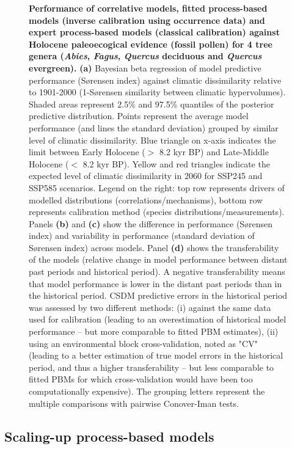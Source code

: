 \documentclass[pdflatex, sn-nature]{sn-jnl}%
\begin{document}
\begin{figure}[ht]
\begin{adjustwidth}{-0.5cm}{-0.5cm}
\caption{\textbf{Performance of correlative models, fitted process-based models (inverse calibration using occurrence data) and expert process-based models (classical calibration) against Holocene paleoecogical evidence (fossil pollen) for 4 tree genera (\emph{Abies}, \emph{Fagus}, \emph{Quercus} deciduous and \emph{Quercus} evergreen).} \textbf{(a)} Bayesian beta regression of model predictive performance (Sørensen index) against climatic dissimilarity relative to 1901-2000 (1-Sørensen similarity between climatic hypervolumes). Shaded areas represent 2.5\% and 97.5\% quantiles of the posterior predictive distribution. Points represent the average model performance (and lines the standard deviation) grouped by similar level of climatic dissimilarity. Blue triangle on x-axis indicates the limit between Early Holocene ($>$ 8.2 kyr BP) and Late-Middle Holocene ($<$ 8.2 kyr BP). Yellow and red triangles indicate the expected level of climatic dissimilarity in 2060 for SSP245 and SSP585 scenarios. Legend on the right: top row represents drivers of modelled distributions (correlations/mechanisms), bottom row represents calibration method (species distributions/measurements). Panels \textbf{(b)} and \textbf{(c)} show the difference in performance (Sørensen index) and variability in performance (standard deviation of Sørensen index) across models. Panel \textbf{(d)} shows the transferability of the models (relative change in model performance between distant past periods and historical period). A negative transferability means that model performance is lower in the distant past periods than in the historical period. CSDM predictive errors in the historical period was assessed by two different methods: (i) against the same data used for calibration (leading to an overestimation of historical model performance -- but more comparable to fitted PBM estimates), (ii) using an environmental block cross-validation, noted as "CV" (leading to a better estimation of true model errors in the historical period, and thus a higher transferability -- but less comparable to fitted PBMs for which cross-validation would have been too computationally expensive). The grouping letters represent the multiple comparisons with pairwise Conover-Iman tests. }\label{past_performance}
\end{adjustwidth}
\end{figure}

\subsection{Scaling-up process-based models}
\end{document}
